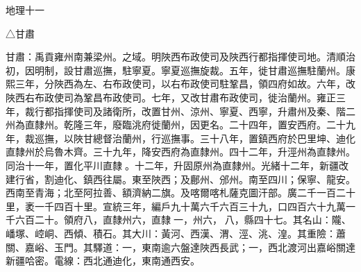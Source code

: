 
\begin{pinyinscope}
地理十一

△甘肅

甘肅：禹貢雍州南兼梁州。之域。明陜西布政使司及陜西行都指揮使司地。清順治初，因明制，設甘肅巡撫，駐寧夏。寧夏巡撫旋裁。五年，徙甘肅巡撫駐蘭州。康熙三年，分陜西為左、右布政使司，以右布政使司駐鞏昌，領四府如故。六年，改陜西右布政使司為鞏昌布政使司。七年，又改甘肅布政使司，徙治蘭州。雍正三年，裁行都指揮使司及諸衛所，改置甘州、涼州、寧夏、西寧，升肅州及秦、階二州為直隸州。乾隆三年，廢臨洮府徙蘭州，因更名。二十四年，置安西府。二十九年，裁巡撫，以陜甘總督治蘭州，行巡撫事。三十八年，置鎮西府於巴里坤、迪化直隸州於烏魯木齊。三十九年，降安西府為直隸州。四十二年，升涇州為直隸州。同治十一年，置化平川直隸。十二年，升固原州為直隸州。光緒十二年，新疆改建行省，割迪化、鎮西往屬。東至陜西；及鄜州、邠州。南至四川；保寧、龍安。西南至青海；北至阿拉善、額濟納二旗。及喀爾喀札薩克圖汗部。廣二千一百二十里，袤一千四百十里。宣統三年，編戶九十萬六千六百三十九，口四百六十九萬一千六百二十。領府八，直隸州六，直隸一，州六，八，縣四十七。其名山：隴、嶓塚、崆峒、西傾、積石。其大川：黃河、西漢、渭、涇、洮、湟。其重險：蕭關、嘉峪、玉門。其驛道：一，東南逾六盤達陜西長武；一，西北渡河出嘉峪關達新疆哈密。電線：西北通迪化，東南通西安。


\end{pinyinscope}
